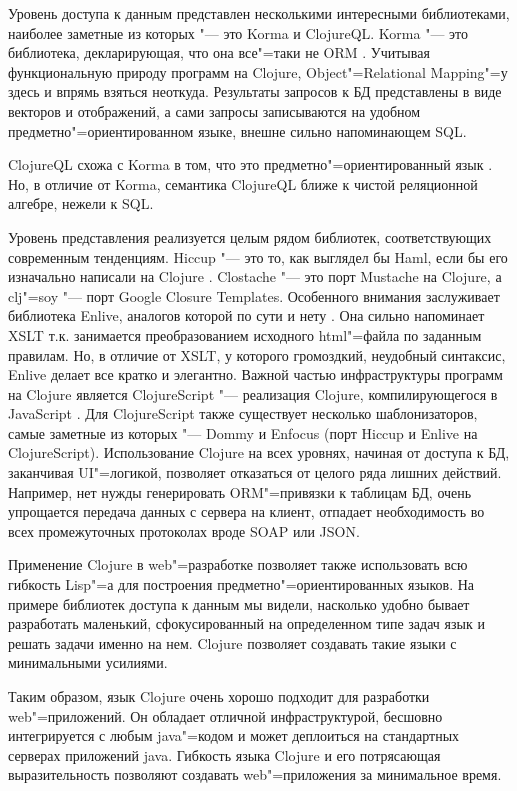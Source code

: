 \documentclass[10pt, a5paper]{article}
\begin{document}
Уровень доступа к данным представлен несколькими интересными библиотеками, наиболее заметные из которых "--- это Korma и ClojureQL.
Korma "--- это библиотека, декларирующая, что она все"=таки не ORM \cite{Bushenko4}. Учитывая функциональную природу программ на Clojure, Object"=Relational Mapping"=у здесь и впрямь взяться неоткуда. Результаты запросов к БД представлены в виде векторов и отображений, а сами запросы записываются на удобном предметно"=ориентированном языке, внешне сильно напоминающем SQL.

ClojureQL схожа с Korma в том, что это предметно"=ориентированный язык \cite{Bushenko5}. Но, в отличие от Korma, семантика ClojureQL ближе к чистой реляционной алгебре, нежели к SQL.

Уровень представления реализуется целым рядом библиотек, соответствующих современным тенденциям. Hiccup "--- это то, как выглядел бы Haml, если бы его изначально написали на Clojure \cite{Bushenko6}. Clostache "--- это порт Mustache на Clojure, а clj"=soy "--- порт Google Closure Templates. Особенного внимания заслуживает библиотека Enlive, аналогов которой по сути и нету \cite{Bushenko7}. Она сильно напоминает XSLT т.к. занимается преобразованием исходного html"=файла по заданным правилам. Но, в отличие от XSLT, у которого громоздкий, неудобный синтаксис, Enlive делает все кратко и элегантно.
Важной частью инфраструктуры программ на Clojure является ClojureScript "--- реализация Clojure, компилирующегося в JavaScript \cite{Bushenko8}. Для ClojureScript также существует несколько шаблонизаторов, самые заметные из которых "--- Dommy \cite{Bushenko9} и Enfocus \cite{Bushenko10} (порт Hiccup и Enlive на ClojureScript). Использование Clojure на всех уровнях, начиная от доступа к БД, заканчивая UI"=логикой, позволяет отказаться от целого ряда лишних действий. Например, нет нужды генерировать ORM"=привязки к таблицам БД, очень упрощается передача данных с сервера на клиент, отпадает необходимость во всех промежуточных протоколах вроде SOAP или JSON.

Применение Clojure в web"=разработке позволяет также использовать всю гибкость Lisp"=а для построения предметно"=ориентированных языков. На примере библиотек доступа к данным мы видели, насколько удобно бывает разработать маленький, сфокусированный на определенном типе задач язык и решать задачи именно на нем. Clojure позволяет создавать такие языки с минимальными усилиями.

Таким образом, язык Clojure очень хорошо подходит для разработки web"=приложений. Он обладает отличной инфраструктурой, бесшовно интегрируется с любым java"=кодом и может деплоиться на стандартных серверах приложений java. Гибкость языка Clojure и его потрясающая выразительность позволяют создавать web"=приложения за минимальное время.
\end{document}
